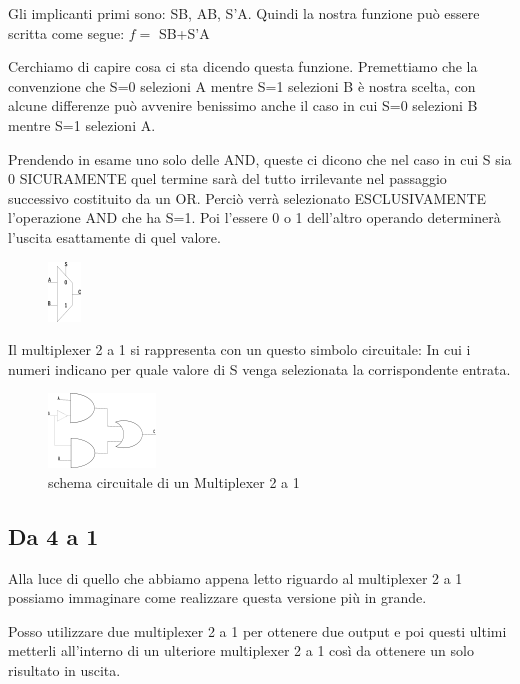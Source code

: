 \documentclass[a4paper]{book}
\begin{document}
Gli implicanti primi sono: SB, AB, S'A.
Quindi la nostra funzione può essere scritta come segue:
\( f=\) SB+S'A

Cerchiamo di capire cosa ci sta dicendo questa funzione.
Premettiamo che la convenzione che S=0 selezioni A mentre S=1 selezioni B è nostra scelta, con alcune differenze può avvenire benissimo anche il caso in cui S=0 selezioni B mentre S=1 selezioni A.

Prendendo in esame uno solo delle AND, queste ci dicono che nel caso in cui S sia 0 SICURAMENTE quel termine sarà del tutto irrilevante nel passaggio successivo costituito da un OR.
Perciò verrà selezionato ESCLUSIVAMENTE l'operazione AND che ha S=1.
Poi l'essere 0 o 1 dell'altro operando determinerà l'uscita esattamente di quel valore.



\begin{figure}
\includegraphics{Multiplexer21}
\end{figure}


Il multiplexer 2 a 1 si rappresenta con un questo simbolo circuitale:
In cui i numeri indicano per quale valore di S venga selezionata la corrispondente entrata.

\begin{figure}
\centering
\includegraphics{Multiplexer21Circuito}
\caption{schema circuitale di un Multiplexer 2 a 1}
\end{figure}


\subsection{Da 4 a 1}

Alla luce di quello che abbiamo appena letto riguardo al multiplexer 2 a 1 possiamo immaginare come realizzare questa versione più in grande.

Posso utilizzare due multiplexer 2 a 1 per ottenere due output e poi questi ultimi metterli all'interno di un ulteriore multiplexer 2 a 1 così da ottenere un solo risultato in uscita.
\end{document}
